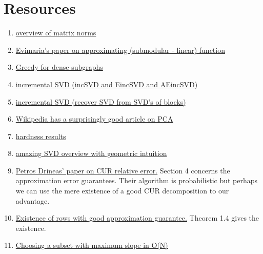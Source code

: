 \documentclass{article}
\begin{document}
\section{Resources}
\begin{enumerate}
    \item \href{https://www.cis.upenn.edu/~cis515/cis515-11-sl4.pdf}{overview of matrix norms}
    \item \href{https://arxiv.org/pdf/2002.07782.pdf}{Evimaria's paper on approximating (submodular - linear) function}
    \item \href{https://users.ics.aalto.fi/gionis/greedy-dense.pdf}{Greedy for dense subgraphs}
    \item \href{https://ieeexplore.ieee.org/stamp/stamp.jsp?tp=&arnumber=8548605}{incremental SVD (incSVD and EincSVD and AEincSVD)}
    \item \href{https://arxiv.org/pdf/1601.07010.pdf}{incremental SVD (recover SVD from SVD's of blocks)}
    \item \href{https://en.wikipedia.org/wiki/Principal_component_analysis#Iterative_computation}{Wikipedia has a surprisingly good article on PCA}
    \item \href{https://www.semanticscholar.org/paper/The-intractability-of-computing-the-minimum-of-a-Vardy/2e0b89803e126a41e872f1d68eeb3e8eb71698c5}{hardness results}
    \item \href{https://www.cs.cmu.edu/~venkatg/teaching/CStheory-infoage/book-chapter-4.pdf}{amazing SVD overview with geometric intuition}
    \item \href{https://www.cs.purdue.edu/homes/pdrineas/documents/publications/Drineas_SIMAX_08b.pdf}{Petros Drineas' paper on CUR relative error.} Section 4 concerns the approximation error guarantees. Their algorithm is probabilistic but perhaps we can use the mere existence of a good CUR decomposition to our advantage.
    \item \href{https://www.theoryofcomputing.org/articles/v002a012/v002a012.pdf}{Existence of rows with good approximation guarantee.} Theorem 1.4 gives the existence.
    \item \href{https://www.ics.uci.edu/~eppstein/pubs/EppHir-Algs-97.pdf}{Choosing a subset with maximum slope in O(N)}
\end{enumerate}
\end{document}
